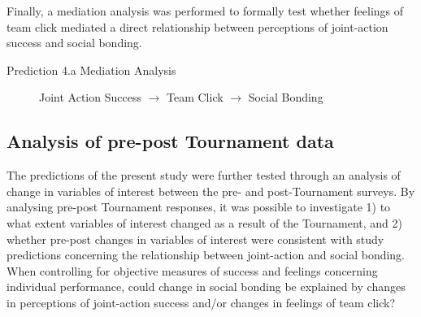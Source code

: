 \documentclass[12pt]{report}
\begin{document}
{Finally, a mediation analysis was performed to formally test whether feelings of team click mediated a direct relationship between perceptions of joint-action success and social bonding.

\begin{description}
\item[Prediction 4.a Mediation Analysis] Joint Action Success $\rightarrow$ Team Click $\rightarrow$ Social Bonding
\end{description}







\clearpage
\subsection{Analysis of pre-post Tournament data}
The predictions of the present study were further tested through an analysis of change in variables of interest between the pre- and post-Tournament surveys. By analysing pre-post Tournament responses, it was possible to investigate 1) to what extent variables of interest changed as a result of the Tournament, and 2) whether pre-post changes in variables of interest were consistent with study predictions concerning the relationship between joint-action and social bonding. When controlling for objective measures of success and feelings concerning individual performance, could change in social bonding be explained by changes in perceptions of joint-action success and/or changes in feelings of team click?


}
\end{document}

